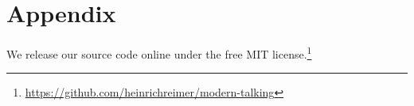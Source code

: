 \appendix
\section{Appendix}

We release our source code online under the free MIT license.\footnote{\url{https://github.com/heinrichreimer/modern-talking}}

